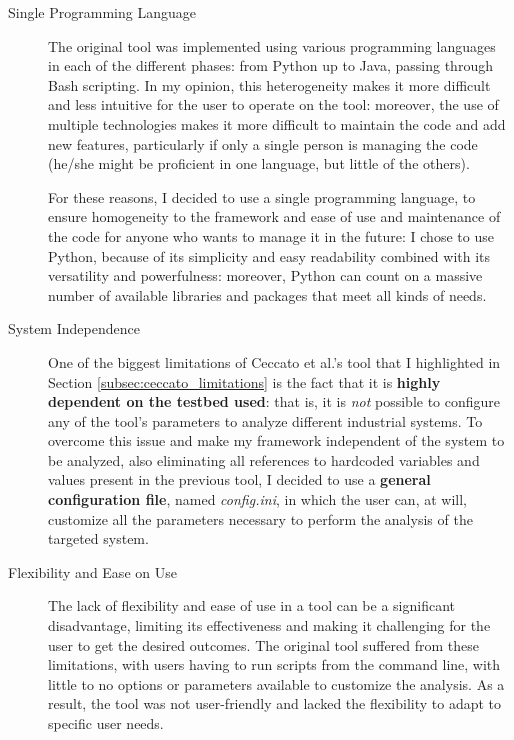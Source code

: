 \begin{description}
	\item[Single Programming Language] The original tool was implemented using various programming languages in each of the different phases: from Python up to Java, passing through Bash scripting. \newline
	In my opinion, this heterogeneity makes it more difficult and less intuitive for the user to operate on the tool: moreover, the use of multiple technologies makes it more difficult to maintain the code and add new features, particularly if only a single person is managing the code (he/she might be proficient in one language, but little of the others).
	
	\bigskip
	For these reasons, I decided to use a single programming language, to ensure homogeneity to the framework and ease of use and maintenance of the code for anyone who wants to manage it in the future: I chose to use Python, because of its simplicity and easy readability combined with its versatility and powerfulness: moreover, Python can count on a massive number of available libraries and packages that meet all kinds of needs.
	
	\item[System Independence] One of the biggest limitations of Ceccato et al.'s tool that I highlighted in Section \ref{subsec:ceccato_limitations} is the fact that it is \textbf{highly dependent on the testbed used}: that is, it is \textit{not} possible to configure any of the tool's parameters to analyze different industrial systems.\newline
	To overcome this issue and make my framework independent of the system to be analyzed, also eliminating all references to hardcoded variables and values present in the previous tool, I decided to use a \textbf{general configuration file}, named \textit{config.ini}, in which the user can, at will, customize all the parameters necessary to perform the analysis of the targeted system.
	
	\item[Flexibility and Ease on Use] The lack of flexibility and ease of use in a tool can be a significant disadvantage, limiting its effectiveness and making it challenging for the user to get the desired outcomes. The original tool suffered from these limitations, with users having to run scripts from the command line, with little to no options or parameters available to customize the analysis. As a result, the tool was not user-friendly and lacked the flexibility to adapt to specific user needs. 
	

\end{description}
